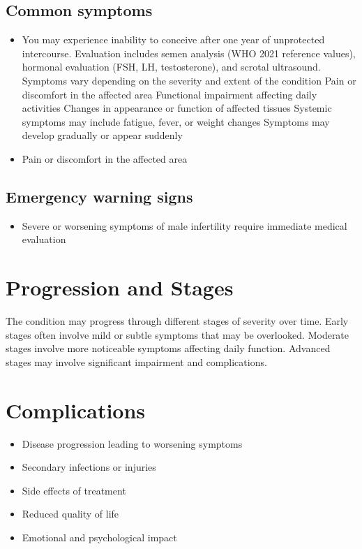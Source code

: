 \subsection{Common symptoms}
\begin{itemize}[noitemsep]
  \item You may experience inability to conceive after one year of unprotected intercourse. Evaluation includes semen analysis (WHO 2021 reference values), hormonal evaluation (FSH, LH, testosterone), and scrotal ultrasound. Symptoms vary depending on the severity and extent of the condition Pain or discomfort in the affected area Functional impairment affecting daily activities Changes in appearance or function of affected tissues Systemic symptoms may include fatigue, fever, or weight changes Symptoms may develop gradually or appear suddenly
  \item Pain or discomfort in the affected area
  \end{itemize}

\subsection{Emergency warning signs}
\begin{itemize}[noitemsep]
  \item Severe or worsening symptoms of male infertility require immediate medical evaluation
\end{itemize}
\section{Progression and Stages}
The condition may progress through different stages of severity over time. Early stages often involve mild or subtle symptoms that may be overlooked. Moderate stages involve more noticeable symptoms affecting daily function. Advanced stages may involve significant impairment and complications.
\section{Complications}
\begin{itemize}[noitemsep]
  \item Disease progression leading to worsening symptoms
  \item Secondary infections or injuries
  \item Side effects of treatment
  \item Reduced quality of life
  \item Emotional and psychological impact
\end{itemize}
